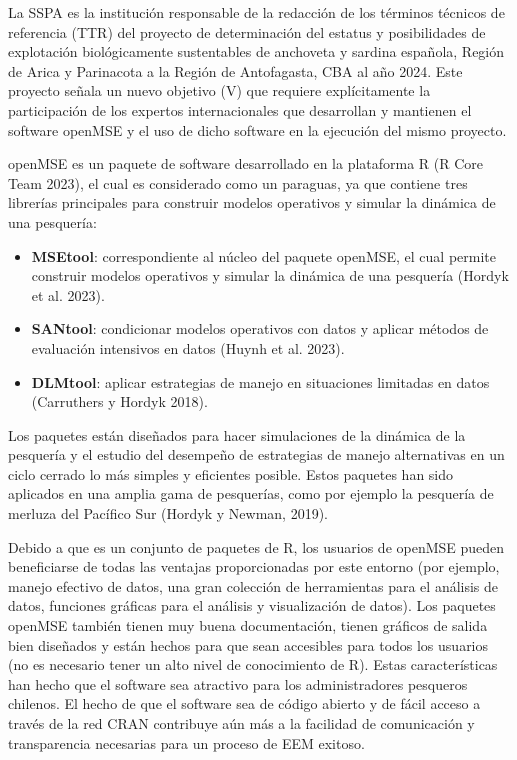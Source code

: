 
La SSPA es la institución responsable de la redacción de los términos técnicos de referencia (TTR) del proyecto de determinación del estatus y posibilidades de explotación biológicamente sustentables de anchoveta y sardina española, Región de Arica y Parinacota a la Región de Antofagasta, CBA al año 2024. Este proyecto señala un nuevo objetivo (V) que requiere explícitamente la participación de los expertos internacionales que desarrollan y mantienen el software openMSE y el uso de dicho software en la ejecución del mismo proyecto. 
\newline

openMSE es un paquete de software desarrollado en la plataforma R (R Core Team 2023), el cual es considerado como un paraguas, ya que contiene tres librerías principales para construir modelos operativos y simular la dinámica de una pesquería:

\begin{itemize}
    \item \textbf{MSEtool}: correspondiente al núcleo del paquete openMSE, el cual permite construir modelos operativos y simular la dinámica de una pesquería (Hordyk et al. 2023).
    \item \textbf{SANtool}: condicionar modelos operativos con datos y aplicar métodos de evaluación intensivos en datos (Huynh et al. 2023). 
    \item \textbf{DLMtool}: aplicar estrategias de manejo en situaciones limitadas en datos (Carruthers y Hordyk 2018).
\end{itemize}

Los paquetes están diseñados para hacer simulaciones de la dinámica de la pesquería y el estudio del desempeño de estrategias de manejo alternativas en  un ciclo cerrado lo más simples y eficientes posible. Estos paquetes han sido aplicados en una amplia gama de pesquerías, como por ejemplo la pesquería de merluza del Pacífico Sur (Hordyk y Newman, 2019).
\newline

Debido a que es un conjunto de paquetes de R, los usuarios de openMSE pueden beneficiarse de todas las ventajas proporcionadas por este entorno (por ejemplo, manejo efectivo de datos, una gran colección de herramientas para el análisis de datos, funciones gráficas para el análisis y visualización de datos). Los paquetes openMSE también tienen muy buena documentación, tienen gráficos de salida bien diseñados y están hechos para que sean accesibles para todos los usuarios (no es necesario tener un alto nivel de conocimiento de R). Estas características han hecho que el software sea atractivo para los administradores pesqueros chilenos. El hecho de que el software sea de código abierto y de fácil acceso a través de la red CRAN contribuye aún más a la facilidad de comunicación y transparencia necesarias para un proceso de EEM exitoso.
